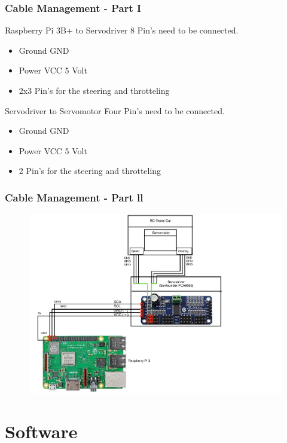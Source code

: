 \documentclass{beamer}
\begin{document}

\begin{frame}
\frametitle{Cable Management - Part I}
\begin{block}{Raspberry Pi 3B+ to Servodriver}
8 Pin's need to be connected. 
\begin{itemize}
\item Ground GND
\item Power VCC 5 Volt
\item 2x3 Pin's for the steering and throtteling
\end{itemize}
\end{block}

\begin{block}{Servodriver to Servomotor}
Four Pin's need to be connected. 
\begin{itemize}
\item Ground GND
\item Power VCC 5 Volt
\item 2 Pin's for the steering and throtteling
\end{itemize}
\end{block}
%
\end{frame}


\begin{frame}
\frametitle{Cable Management - Part ll}
\begin{figure}
\includegraphics[width=0.7\linewidth]{photo/ebene2.pdf}
\end{figure}
\end{frame}

\section{Software}
\end{document}
